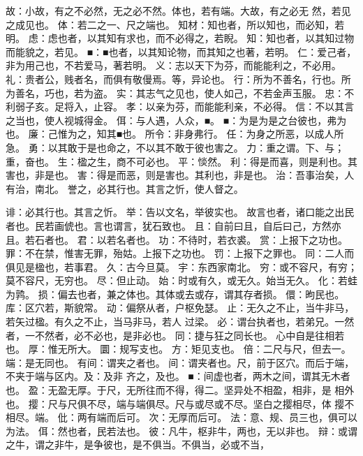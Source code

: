 \documentclass[12pt,UTF8]{ctexbook}
\begin{document}
故：小故，有之不必然，无之必不然。体也，若有端。大故，有之必无 
然，若见之成见也。 
体：若二之一、尺之端也。 
知材：知也者，所以知也，而必知，若明。 
虑：虑也者，以其知有求也，而不必得之，若睨。 
知：知也者，以其知过物而能貌之，若见。 
■：■也者，以其知论物，而其知之也著，若明。 
仁：爱己者，非为用己也，不若爱马，著若明。 
义：志以天下为芬，而能能利之，不必用。 
礼：贵者公，贱者名，而俱有敬僈焉。等，异论也。 
行：所为不善名，行也。所为善名，巧也，若为盗。 
实：其志气之见也，使人如己，不若金声玉服。 
忠：不利弱子亥。足将入，止容。 
孝：以亲为芬，而能能利亲，不必得。 
信：不以其言之当也，使人视城得金。 
佴：与人遇，人众，■。 
■：为是为是之台彼也，弗为也。 
廉：己惟为之，知其■也。 
所令：非身弗行。 
任：为身之所恶，以成人所急。 
勇：以其敢于是也命之，不以其不敢于彼也害之。 
力：重之谓。下、与；重，奋也。 
生：楹之生，商不可必也。 
平：惔然。 
利：得是而喜，则是利也。其害也，非是也。 
害：得是而恶，则是害也。其利也，非是也。 
治：吾事治矣，人有治，南北。 
誉之，必其行也。其言之忻，使人督之。 

诽：必其行也。其言之忻。 
举：告以文名，举彼实也。 
故言也者，诸口能之出民者也。民若画俿也。言也谓言，犹石致也。 
且：自前曰且，自后曰己，方然亦且。若石者也。 
君：以若名者也。 
功：不待时，若衣裘。 
赏：上报下之功也。 
罪：不在禁，惟害无罪，殆姑。上报下之功也。 
罚：上报下之罪也。 
同：二人而俱见是楹也，若事君。 
久：古今旦莫。 
宇：东西家南北。 
穷：或不容尺，有穷；莫不容尺，无穷也。 
尽：但止动。 
始：时或有久，或无久。始当无久。 
化：若蛙为鹑。 
损：偏去也者，兼之体也。其体或去或存，谓其存者损。 
儇：昫民也。 
库：区穴若，斯貌常。 
动：偏祭从者，户枢免瑟。 
止：无久之不止，当牛非马，若矢过楹。有久之不止，当马非马，若人 
过梁。 
必：谓台执者也，若弟兄。一然者，一不然者，必不必也，是非必也。 
同：捷与狂之同长也。 
心中自是往相若也。 
厚：惟无所大。 
圜：规写支也。 
方：矩见支也。 
倍：二尺与尺，但去一。 
端：是无同也。 
有间：谓夹之者也。 
间：谓夹者也。尺，前于区穴。而后于端，不夹于端与区内。及：及非 
齐之，及也。 
■：间虚也者，两木之间，谓其无木者也。 
盈：无盈无厚。于尺，无所往而不得，得二。坚异处不相盈，相非，是 
相外也。 
撄：尺与尺俱不尽，端与端俱尽。尺与或尽或不尽。坚白之撄相尽，体 
撄不相尽。端。 
仳：两有端而后可。 
次：无厚而后可。 
法：意、规、员三也，俱可以为法。 
佴：然也者，民若法也。 
彼：凡牛，枢非牛，两也，无以非也。 
辩：或谓之牛，谓之非牛，是争彼也，是不俱当。不俱当，必或不当， 
\end{document}
